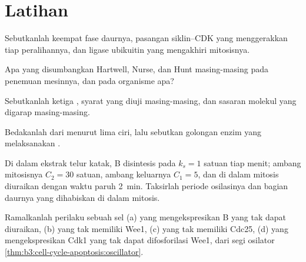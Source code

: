 \section{Latihan}

\begin{exercise}[$\star$]\label{exo:b3:cell-cycle-apoptosis:1}
Sebutkanlah keempat fase daurnya, pasangan siklin--CDK yang menggerakkan
tiap peralihannya, dan ligase ubikuitin yang mengakhiri mitosisnya.
\end{exercise}

\begin{exercise}[$\star$]\label{exo:b3:cell-cycle-apoptosis:2}
Apa yang disumbangkan Hartwell, Nurse, dan Hunt masing-masing pada penemuan
mesinnya, dan pada organisme apa?
\end{exercise}

\begin{exercise}[$\star$]\label{exo:b3:cell-cycle-apoptosis:3}
Sebutkanlah ketiga , syarat yang diuji masing-masing, dan
sasaran molekul yang digarap masing-masing.
\end{exercise}

\begin{exercise}[$\star$]\label{exo:b3:cell-cycle-apoptosis:4}
Bedakanlah  dari  menurut lima ciri, lalu sebutkan
golongan enzim yang melaksanakan .
\end{exercise}

\begin{exercise}[$\star\star$]\label{exo:b3:cell-cycle-apoptosis:5}
Di dalam ekstrak telur katak,  B disintesis pada $k_{s} = 1$ satuan tiap
menit; ambang mitosisnya $C_{2} = 30$ satuan, ambang keluarnya
$C_{1} = 5$, dan di dalam mitosis  diuraikan dengan waktu paruh
\qty{2}{min}. Taksirlah periode osilasinya dan bagian
daurnya yang dihabiskan di dalam mitosis.
\end{exercise}

\begin{exercise}[$\star\star$]\label{exo:b3:cell-cycle-apoptosis:6}
Ramalkanlah perilaku sebuah sel (a) yang mengekspresikan  B yang tak
dapat diuraikan, (b) yang tak memiliki Wee1, (c) yang tak memiliki Cdc25, (d)
yang mengekspresikan Cdk1 yang tak dapat difosforilasi Wee1, dari segi
osilator \cref{thm:b3:cell-cycle-apoptosis:oscillator}.
\end{exercise}

